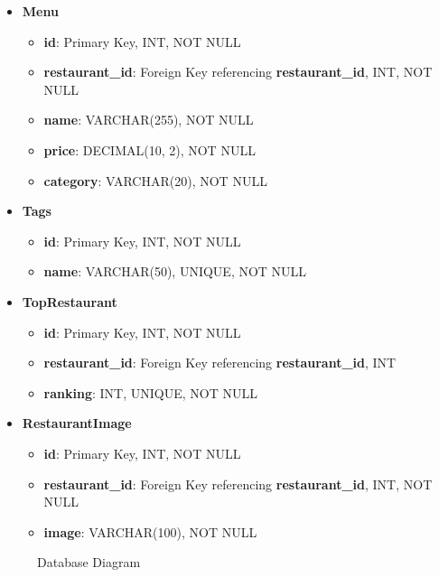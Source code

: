 \documentclass[12pt, a4paper, oneside]{article}
\begin{document}
\begin{itemize}
    \item \textbf{Menu}
    \begin{itemize}
        \item \textbf{id}: Primary Key, INT, NOT NULL
        \item \textbf{restaurant\_id}: Foreign Key referencing \textbf{restaurant\_id}, INT, NOT NULL
        \item \textbf{name}: VARCHAR(255), NOT NULL
        \item \textbf{price}: DECIMAL(10, 2), NOT NULL
        \item \textbf{category}: VARCHAR(20), NOT NULL
    \end{itemize}

    \item \textbf{Tags}
    \begin{itemize}
        \item \textbf{id}: Primary Key, INT, NOT NULL
        \item \textbf{name}: VARCHAR(50), UNIQUE, NOT NULL
    \end{itemize}

    \item \textbf{TopRestaurant}
    \begin{itemize}
        \item \textbf{id}: Primary Key, INT, NOT NULL
        \item \textbf{restaurant\_id}: Foreign Key referencing \textbf{restaurant\_id}, INT
        \item \textbf{ranking}: INT, UNIQUE, NOT NULL
    \end{itemize}

    \item \textbf{RestaurantImage}
    \begin{itemize}
        \item \textbf{id}: Primary Key, INT, NOT NULL
        \item \textbf{restaurant\_id}: Foreign Key referencing \textbf{restaurant\_id}, INT, NOT NULL
        \item \textbf{image}: VARCHAR(100), NOT NULL
    \end{itemize}
\end{itemize}
\begin{figure}[H]
    \centering
    \caption{Database Diagram}
    \label{databaseD}
\end{figure}
\end{document}
